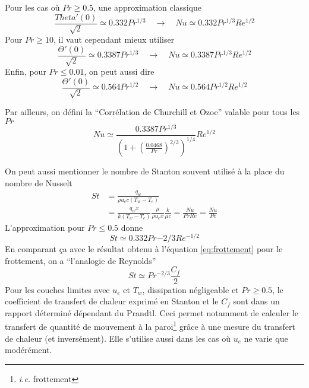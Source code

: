       Pour les cas où $Pr \geq 0.5$, une approximation classique
      \begin{equation}
        \frac{Theta'(0)}{\sqrt{2}} \simeq 0.332 Pr^{1/3} \quad \rightarrow \quad Nu \simeq 0.332 Pr^{1/3} Re^{1/2}
      \end{equation}
      Pour $Pr \geq 10$, il vaut cependant mieux utiliser
      \begin{equation}
        \frac{\Theta'(0)}{\sqrt{2}} \simeq 0.3387 Pr^{1/3} \quad \rightarrow \quad Nu \simeq 0.3387 Pr^{1/3} Re^{1/2}
      \end{equation}
      Enfin, pour $Pr \leq 0.01$, on peut aussi dire
      \begin{equation}
        \frac{\Theta'(0)}{\sqrt{2}} \simeq 0.564 Pr^{1/2} \quad \rightarrow \quad Nu \simeq 0.564 Pr^{1/2} Re^{1/2}
      \end{equation}

      Par ailleurs, on défini la ``Corrélation de Churchill et Ozoe'' valable pour tous les $Pr$
      \begin{equation}
        Nu \simeq \frac{0.3387 Pr^{1/3}}{\left(1 + \left(\frac{0.0468}{Pr}\right)^{2/3}\right)^{1/4}} Re^{1/2}
      \end{equation}

      On peut aussi mentionner le nombre de Stanton souvent utilisé à la place du nombre de Nusselt
      \begin{equation}
        \begin{aligned}
          St &= \frac{q_w}{\rho u_e c (T_w - T_e)}\\
             &= \frac{q_w x}{k (T_w - T_e)} \frac{\mu}{\rho u_e x} \frac{k}{\mu c} = \frac{Nu}{Pr Re} = \frac{Nu}{Pe}
        \end{aligned}
      \end{equation}
      L'approximation pour $Pr \leq 0.5$ donne
      \begin{equation}
        St \simeq 0.332 Pr{-2/3} Re^{-1/2}
      \end{equation}
      En comparant ça avec le résultat obtenu à l'équation \ref{eq:frottement} pour le frottement, on a ``l'analogie de Reynolds''
      \begin{equation}
        St \simeq Pr^{-2/3} \frac{C_f}{2}
      \end{equation}
      Pour les couches limites avec $u_e$ et $T_w$, dissipation négligeable et $Pr \geq 0.5$, le coefficient de transfert de chaleur exprimé en Stanton et le $C_f$ sont dans un rapport déterminé dépendant du Prandtl. Ceci permet notamment de calculer le transfert de quantité de mouvement à la paroi\footnote{\textit{i.e.} frottement} grâce à une mesure du transfert de chaleur (et inversément). Elle s'utilise aussi dans les cas où $u_e$ ne varie que modérément.

